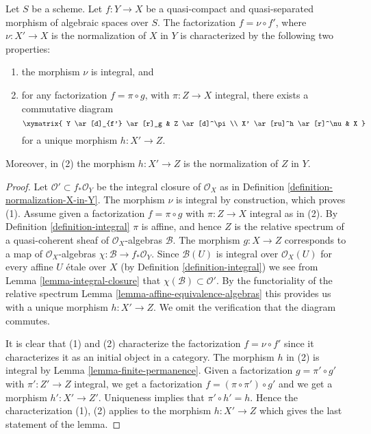 \begin{lemma}
\label{lemma-characterize-normalization}
Let $S$ be a scheme. Let $f : Y \to X$ be a quasi-compact and quasi-separated
morphism of algebraic spaces over $S$. The factorization $f = \nu \circ f'$,
where $\nu : X' \to X$ is the normalization of $X$ in $Y$ is characterized
by the following two properties:
\begin{enumerate}
\item the morphism $\nu$ is integral, and
\item for any factorization $f = \pi \circ g$, with $\pi : Z \to X$
integral, there exists a commutative diagram
$$
\xymatrix{
Y \ar[d]_{f'} \ar[r]_g & Z \ar[d]^\pi \\
X' \ar[ru]^h \ar[r]^\nu & X
}
$$
for a unique morphism $h : X' \to Z$.
\end{enumerate}
Moreover, in (2) the morphism $h : X' \to Z$ is the normalization of
$Z$ in $Y$.
\end{lemma}

\begin{proof}
Let $\mathcal{O}' \subset f_*\mathcal{O}_Y$ be the integral closure of
$\mathcal{O}_X$ as in Definition \ref{definition-normalization-X-in-Y}.
The morphism $\nu$ is integral by construction, which proves (1).
Assume given a factorization $f = \pi \circ g$ with $\pi : Z \to X$
integral as in (2). By Definition \ref{definition-integral}
$\pi$ is affine, and hence $Z$ is the relative
spectrum of a quasi-coherent sheaf of $\mathcal{O}_X$-algebras $\mathcal{B}$.
The morphism $g : X \to Z$ corresponds to a map of $\mathcal{O}_X$-algebras
$\chi : \mathcal{B} \to f_*\mathcal{O}_Y$. Since $\mathcal{B}(U)$ is
integral over $\mathcal{O}_X(U)$ for every affine $U$ \'etale over $X$
(by Definition \ref{definition-integral})
we see from Lemma \ref{lemma-integral-closure}
that $\chi(\mathcal{B}) \subset \mathcal{O}'$.
By the functoriality of the relative spectrum
Lemma \ref{lemma-affine-equivalence-algebras}
this provides us with a unique morphism
$h : X' \to Z$. We omit the verification that the diagram commutes.

\medskip\noindent
It is clear that (1) and (2) characterize the
factorization $f = \nu \circ f'$ since it characterizes it
as an initial object in a category. The morphism $h$ in (2)
is integral by Lemma \ref{lemma-finite-permanence}.
Given a factorization $g = \pi' \circ g'$ with $\pi' : Z' \to Z$
integral, we get a factorization $f = (\pi \circ \pi') \circ g'$ and
we get a morphism $h' : X' \to Z'$. Uniqueness implies that
$\pi' \circ h' = h$. Hence the characterization (1), (2) applies
to the morphism $h : X' \to Z$ which gives the last statement of the lemma.
\end{proof}

